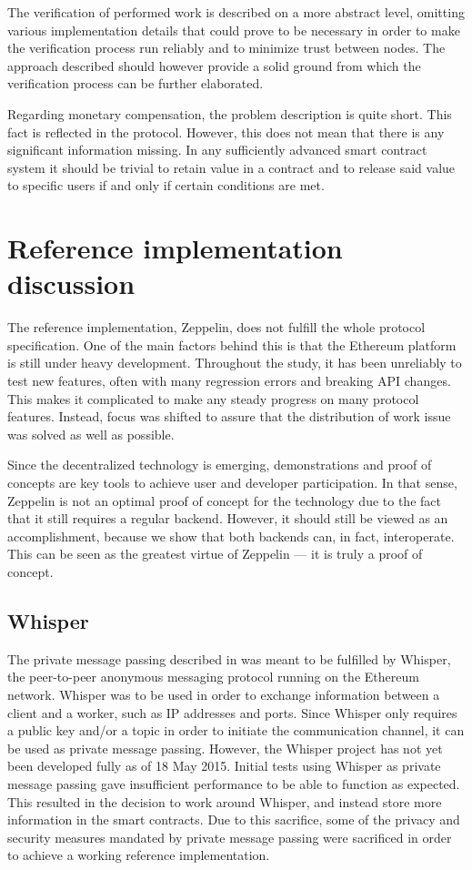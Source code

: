 The verification of performed work is described on a more abstract level, omitting various implementation details that could prove to be necessary in order to make the verification process run reliably and to minimize trust between nodes. The approach described should however provide a solid ground from which the verification process can be further elaborated.

Regarding monetary compensation, the problem description is quite short. This fact is reflected in the protocol. However, this does not mean that there is any significant information missing. In any sufficiently advanced smart contract system it should be trivial to retain value in a contract and to release said value to specific users if and only if certain conditions are met.

\section{Reference implementation discussion}
The reference implementation, Zeppelin, does not fulfill the whole protocol specification. One of the main factors behind this is that the Ethereum platform is still under heavy development. Throughout the study, it has been unreliably to test new features, often with many regression errors and breaking API changes. This makes it complicated to make any steady progress on many protocol features. Instead, focus was shifted to assure that the distribution of work issue was solved as well as possible.

Since the decentralized technology is emerging, demonstrations and proof of concepts are key tools to achieve user and developer participation. In that sense, Zeppelin is not an optimal proof of concept for the technology due to the fact that it still requires a regular backend. However, it should still be viewed as an accomplishment, because we show that both backends can, in fact, interoperate. This can be seen as the greatest virtue of Zeppelin --- it is truly a proof of concept.

\subsection{Whisper}
The private message passing described in  was meant to be fulfilled by Whisper, the peer-to-peer anonymous messaging protocol running on the Ethereum network. Whisper was to be used in order to exchange information between a client and a worker, such as IP addresses and ports. Since Whisper only requires a public key and/or a topic in order to initiate the communication channel, it can be used as private message passing. However, the Whisper project has not yet been developed fully as of 18 May 2015. Initial tests using Whisper as private message passing gave insufficient performance to be able to function as expected. This resulted in the decision to work around Whisper, and instead store more information in the smart contracts. Due to this sacrifice, some of the privacy and security measures mandated by private message passing were sacrificed in order to achieve a working reference implementation.

